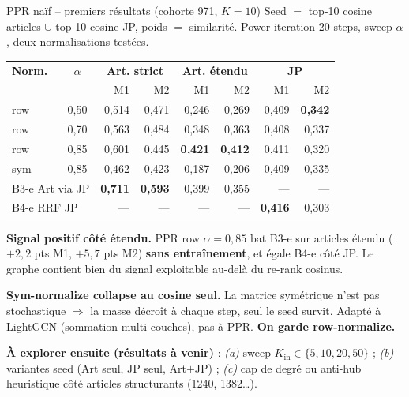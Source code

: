 \documentclass[aspectratio=169,10pt]{beamer}
\newcommand{\warnbox}[1]{%
  \begin{center}
  \colorbox{red!10}{\parbox{0.92\linewidth}{\centering #1}}
  \end{center}}
\newcommand{\okbox}[1]{%
  \begin{center}
  \colorbox{green!10}{\parbox{0.92\linewidth}{\centering #1}}
  \end{center}}
\newcommand{\crossbox}[1]{%
  \begin{center}
  \colorbox{violet!10}{\parbox{0.92\linewidth}{\centering #1}}
  \end{center}}
\begin{document}
\begin{frame}{PPR naïf -- premiers résultats (cohorte 971, $K{=}10$)}
  \scriptsize
  Seed $=$ top-10 cosine articles $\cup$ top-10 cosine JP, poids $=$ similarité.
  Power iteration 20 steps, sweep $\alpha$, deux normalisations testées.

  \vspace{0.3em}
  \renewcommand{\arraystretch}{1.1}
  \setlength{\tabcolsep}{4pt}
  \begin{center}
  \begin{tabular}{@{}l c | r r r r | r r@{}}
    \toprule
    \textbf{Norm.} & $\alpha$
    & \multicolumn{2}{c}{\textbf{Art. strict}} & \multicolumn{2}{c|}{\textbf{Art. étendu}}
    & \multicolumn{2}{c}{\textbf{JP}} \\
     & & M1 & M2 & M1 & M2 & M1 & M2 \\
    \midrule
    row & 0,50 & 0,514 & 0,471 & 0,246 & 0,269 & 0,409 & \textbf{0,342} \\
    row & 0,70 & 0,563 & 0,484 & 0,348 & 0,363 & 0,408 & 0,337 \\
    \rowcolor{accentsoft}
    row & 0,85 & 0,601 & 0,445 & \textbf{0,421} & \textbf{0,412} & 0,411 & 0,320 \\
    \midrule
    sym & 0,85 & 0,462 & 0,423 & 0,187 & 0,206 & 0,409 & 0,335 \\
    \midrule
    \multicolumn{2}{l|}{B3-e Art via JP}
                  & \textbf{0,711} & \textbf{0,593} & 0,399 & 0,355 & --- & --- \\
    \multicolumn{2}{l|}{B4-e RRF JP}
                  & --- & --- & --- & --- & \textbf{0,416} & 0,303 \\
    \bottomrule
  \end{tabular}
  \end{center}

  \vspace{0.2em}
  \okbox{\scriptsize\textbf{Signal positif côté étendu.} PPR row $\alpha{=}0{,}85$ bat B3-e
  sur articles étendu ($+2{,}2$ pts M1, $+5{,}7$ pts M2) \textbf{sans entraînement}, et égale
  B4-e côté JP. Le graphe contient bien du signal exploitable au-delà du re-rank cosinus.}

  \vspace{0.2em}
  \warnbox{\scriptsize\textbf{Sym-normalize collapse au cosine seul.} La matrice symétrique
  n'est pas stochastique $\Rightarrow$ la masse décroît à chaque step, seul le seed survit.
  Adapté à LightGCN (sommation multi-couches), pas à PPR. \textbf{On garde row-normalize.}}

  \vspace{0.2em}
  \crossbox{\scriptsize\textbf{À explorer ensuite (résultats à venir)} :
  \textit{(a)} sweep $K_{\text{in}} \in \{5, 10, 20, 50\}$ ;
  \textit{(b)} variantes seed (Art seul, JP seul, Art$+$JP) ;
  \textit{(c)} cap de degré ou anti-hub heuristique côté articles structurants (1240, 1382\ldots).}
\end{frame}
\end{document}
